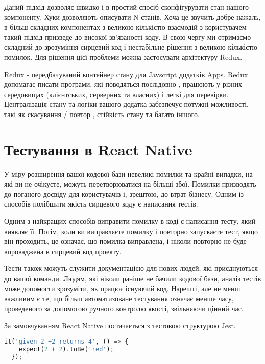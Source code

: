Даний підхід дозволяє швидко і в простий спосіб сконфігурувати стан нашого компоненту.
Хуки дозволяють описувати N станів.
Хоча це звучить добре нажаль, в більш складних компонентах з великою кількістю взаємодій з користувачем такий підхід призведе до високої зв'язаності коду.
В свою чергу ми отримаємо складний до зрозуміння сирцевий код і нестабільне рішення з великою кількістю помилок.
Для рішення цієї проблеми можна застосувати архітектуру Redux.

Redux - передбачуваний контейнер стану для Javscript додатків Apps.
Redux допомагає писати програми, які поводяться послідовно , працюють у різних середовищах (клієнтських, серверних та власних) і легкі для перевірки. \cite{redux_home_page}
Централізація стану та логіки вашого додатка забезпечує потужні можливості, такі як скасування / повтор , стійкість стану та багато іншого. \cite{redux_home_page}


\section{Тестування в React Native}
\label{section.2.9}
У міру розширення вашої кодової бази невеликі помилки та крайні випадки, на які ви не очікуєте, можуть перетворюватися на більші збої.
Помилки призводять до поганого досвіду для користувачів і, зрештою, до втрат бізнесу.
Одним із способів полібшити якість сирцевого коду є написання тестів.

Одним з найкращих способів виправити помилку в коді є написання тесту, який виявляє її.
Потім, коли ви виправляєте помилку і повторно запускаєте тест, якщо він проходить, це означає, що помилка виправлена, і ніколи повторно не буде впроваджена в сирцевий код проекту.

Тести також можуть служити документацією для нових людей, які приєднуються до вашої команди.
Людям, які ніколи раніше не бачили кодової бази, аналіз тестів може допомогти зрозуміти, як працює існуючий код.
Нарешті, але не менш важливим є те, що більш автоматизоване тестування означає менше часу, проведеного за допомогою ручного контролю якості, звільняючи цінний час.

За замовчуванням React Native постачається з тестовою структурою Jest. \cite{jest_home_page}

\begin{lstlisting}[style=light, language=Python,label={lst:rn_jest_test},caption=Jest Unit Test]
  it('given 2 +2 returns 4', () => {
    expect(2 + 2).toBe('red');
  });
\end{lstlisting}

